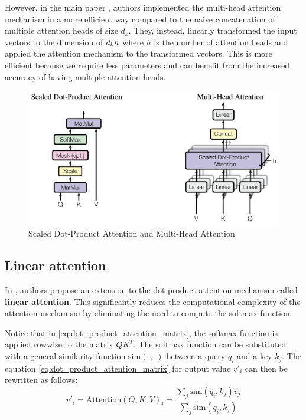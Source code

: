 \documentclass[a4paper, twoside]{report}
\theoremstyle{definition}
\numberwithin{equation}{section}
\begin{document}
However, in the main paper \cite{1706.03762}, authors implemented the multi-head attention mechanism
in a more efficient way compared to the naive concatenation of multiple attention heads
of size $d_k$. They, instead, linearly transformed the input vectors
to the dimension of $d_k\/h$ where $h$ is the number of attention heads and applied
the attention mechanism to the transformed vectors. This is more efficient because
we require less parameters and can benefit from the increased accuracy of having
multiple attention heads.


\begin{figure}[h!]
    \centering
    \includegraphics[scale=0.15]{scaled_dot_product_attention.png}
    \caption{Scaled Dot-Product Attention and Multi-Head Attention \cite{1706.03762}}
    \label{fig:scaled_dot_product_attention}
\end{figure}


\subsection{Linear attention}

In \cite{2006.16236}, authors propose an extension to the dot-product attention mechanism called \textbf{linear attention}.
This significantly reduces the computational complexity of the attention mechanism by eliminating the need to compute the softmax function.

Notice that in \ref{eq:dot_product_attention_matrix}, the softmax function is applied rowwise to the matrix $Q K^T$.
The softmax function can be substituted with a general similarity function $\text{sim}(\cdot, \cdot)$ between a query $q_i$ and a key $k_j$.
The equation \ref{eq:dot_product_attention_matrix} for output value $v'_i$ can then be rewritten as follows:
\begin{equation}
    v'_i=\text{Attention}(Q, K, V)_i=\frac{\sum_j \text{sim}(q_i, k_j) v_j}{\sum_j \text{sim}(q_i, k_j)}
\end{equation}
\end{document}
